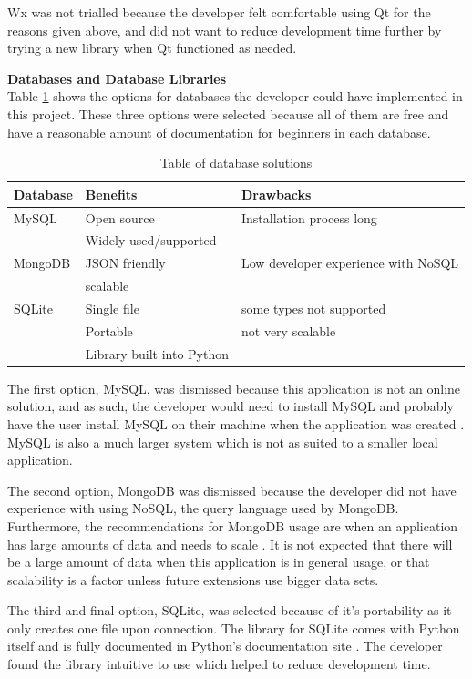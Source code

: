 Wx was not trialled because the developer felt comfortable using Qt for the reasons given above, and did not want to reduce development time further by trying a new library when Qt functioned as needed.

\textbf{Databases and Database Libraries}\\
Table \ref{table:databases} shows the options for databases the developer could have implemented in this project. These three options were selected because all of them are free and have a reasonable amount of documentation for beginners in each database.

\begin{table}[H]
\centering
\begin{tabular}{| l | l | l |} \hline
  {Database} & {Benefits} & {Drawbacks} \\ \hline
  MySQL & Open source & Installation process long \\
  & Widely used/supported & \\ \hline
  MongoDB & JSON friendly & Low developer experience with NoSQL \\ 
  & scalable & \\ \hline
  SQLite & Single file & some types not supported \\
  & Portable & not very scalable \\
  & Library built into Python & \\ \hline
  
  
\end{tabular}
\caption{Table of database solutions}
\label{table:databases}
\end{table}

The first option, MySQL, was dismissed because this application is not an online solution, and as such, the developer would need to install MySQL and probably have the user install MySQL on their machine when the application was created \parencite{mysql}. MySQL is also a much larger system which is not as suited to a smaller local application.

The second option, MongoDB was dismissed because the developer did not have experience with using NoSQL, the query language used by MongoDB. Furthermore, the recommendations for MongoDB usage are when an application has large amounts of data and needs to scale \parencite{mongod}. It is not expected that there will be a large amount of data when this application is in general usage, or that scalability is a factor unless future extensions use bigger data sets.

The third and final option, SQLite, was selected because of it's portability as it only creates one file upon connection. The library for SQLite comes with Python itself and is fully documented in Python's documentation site \parencite{PythonSQLite}. The developer found the library intuitive to use which helped to reduce development time.

